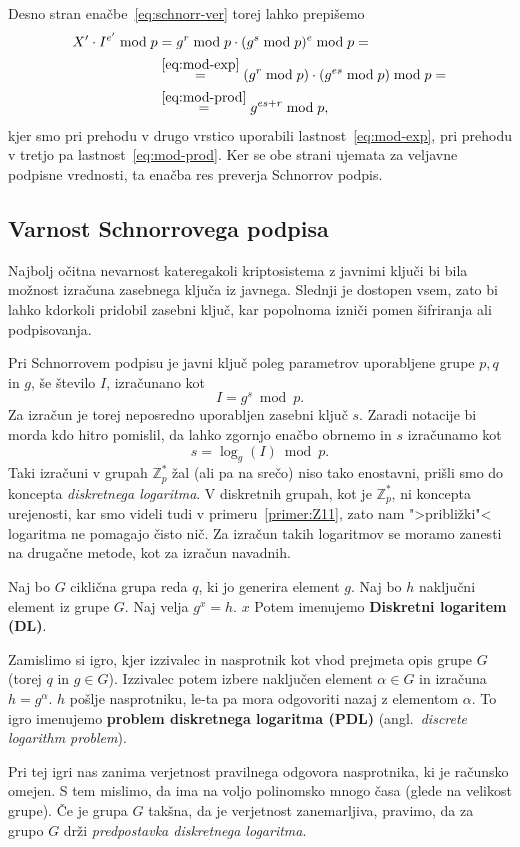 \documentclass[isrm2, tisk]{fmfdelo}
\newcommand{\Z}{\mathbb Z}
\begin{document}
Desno stran enačbe~\eqref{eq:schnorr-ver} torej lahko prepišemo
\begin{align*}
X' \cdot I^{e'} \bmod p &= g^r \bmod p \cdot (g^s \bmod p)^e \bmod p = \\
                        &\stackrel{\eqref{eq:mod-exp}}{=} (g^r \bmod p) \cdot (g^{es} \bmod p) \bmod p = \\ 
                        &\stackrel{\eqref{eq:mod-prod}}{=} g^{es + r} \bmod p,
\end{align*}
kjer smo pri prehodu v drugo vrstico uporabili lastnost~\eqref{eq:mod-exp}, pri prehodu v tretjo 
pa lastnost~\eqref{eq:mod-prod}. Ker se obe strani ujemata za veljavne podpisne vrednosti, ta enačba 
res preverja Schnorrov podpis.

\subsection{Varnost Schnorrovega podpisa}
\label{subsec:sch-varnost}
Najbolj očitna nevarnost kateregakoli kriptosistema z javnimi ključi bi bila možnost izračuna zasebnega 
ključa iz javnega. Slednji je dostopen vsem, zato bi lahko kdorkoli pridobil zasebni ključ, kar 
popolnoma izniči pomen šifriranja ali podpisovanja. 

Pri Schnorrovem podpisu je javni ključ poleg parametrov uporabljene grupe $p, q$ in $g$, še število 
$I$, izračunano kot 
$$ 
I = g^s \bmod p.
$$
Za izračun je torej neposredno uporabljen zasebni ključ $s$. Zaradi notacije bi morda kdo hitro pomislil, 
da lahko zgornjo enačbo obrnemo in $s$ izračunamo kot 
$$ 
s = \log_g(I) \bmod p.
$$
Taki izračuni v grupah $\Z_p^*$ žal (ali pa na srečo) niso tako enostavni, prišli smo do koncepta 
\textit{diskretnega logaritma}. V diskretnih grupah, kot je $\Z_p^*$, ni koncepta urejenosti, kar
smo videli tudi v primeru~\ref{primer:Z11}, zato nam ">približki"< logaritma ne pomagajo čisto nič.
Za izračun takih logaritmov se moramo zanesti na drugačne metode, kot za izračun navadnih.

\begin{definicija}
    Naj bo $G$ ciklična grupa reda $q$, ki jo generira element $g$. Naj bo $h$ naključni element iz 
    grupe $G$. Naj velja $g^x = h$. $x$ Potem imenujemo \textbf{Diskretni logaritem (DL)}.

    Zamislimo si igro, kjer izzivalec in nasprotnik kot vhod prejmeta opis grupe $G$ (torej $q$ in 
    $g \in G$). Izzivalec potem izbere naključen element $\alpha \in G$ in izračuna $h = g^{\alpha}$.
    $h$ pošlje nasprotniku, le-ta pa mora odgovoriti nazaj z elementom $\alpha$. To igro imenujemo 
    \textbf{problem diskretnega logaritma (PDL)} (angl.\ \textit{discrete logarithm problem}).

    Pri tej igri nas zanima verjetnost pravilnega odgovora nasprotnika, ki je računsko omejen. S tem 
    mislimo, da ima na voljo polinomsko mnogo časa (glede na velikost grupe). Če je grupa $G$ takšna, 
    da je verjetnost zanemarljiva, pravimo, da za grupo $G$ drži \textit{predpostavka diskretnega 
    logaritma}.
\end{definicija}
\end{document}
